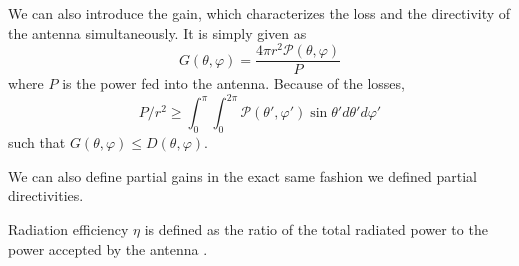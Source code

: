 We can also introduce the gain, which characterizes the loss
and the directivity of the antenna simultaneously. It is simply given
as
  \begin{equation}
    G(\theta,\varphi) = \frac{4\pi r^2\mathcal{P}(\theta,\varphi)}{P}
  \end{equation}
where $P$ is the power fed into the antenna. Because of the 
losses, 
	\begin{equation*}
		P/r^2\geq\int_0^\pi\int_0^{2\pi}\mathcal{P}(\theta',\varphi')\sin\theta'd\theta'd\varphi'
	\end{equation*}
such that $G(\theta,\varphi)\leq D(\theta,\varphi)$. 

We can also define partial gains in the exact same fashion we defined partial
directivities.

Radiation efficiency $\eta$ is defined as the ratio of the total radiated power 
to the power accepted by the antenna \cite{IEEE145-1993}.

